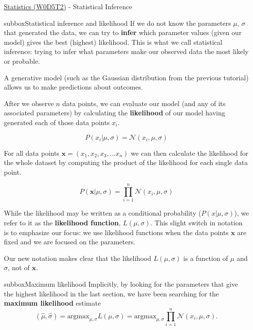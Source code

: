 \begin{textbox}{\href{https://compneuro.neuromatch.io/tutorials/W0D5_Statistics/student/W0D5_Tutorial2.html}{Statistics (W0D5T2)} - Statistical Inference}
\begin{subbox}{subbox}{Statistical inference and likelihood}
\scriptsize
If we do not know the parameters $\mu$, $\sigma$ that generated the data, we can try to \textbf{infer} which parameter values (given our model) gives the best (highest) likelihood. This is what we call statistical inference: trying to infer what parameters make our observed data the most likely or probable.

A generative model (such as the Gaussian distribution from the previous tutorial) allows us to make predictions about outcomes. 

After we observe $n$ data points, we can evaluate our model (and any of its associated parameters) by calculating the \textbf{likelihood} of our model having generated each of those data points $x_i$.

\begin{equation}
P(x_i|\mu,\sigma)=\mathcal{N}(x_i,\mu,\sigma)
\end{equation}

For all data points $\mathbf{x}=(x_1, x_2, x_3, ...x_n) $ we can then calculate the likelihood for the whole dataset by computing the product of the likelihood for each single data point.

\begin{equation}
P(\mathbf{x}|\mu,\sigma)=\prod_{i=1}^n \mathcal{N}(x_i,\mu,\sigma)
\end{equation}

While the likelihood may be written as a conditional probability ($P(x|\mu,\sigma)$), we refer to it as the \textbf{likelihood function}, $L(\mu,\sigma)$.  This slight switch in notation is to emphasize our focus: we use likelihood functions when the data points $\mathbf{x}$ are fixed and we are focused on the parameters.

Our new notation makes clear that the likelihood $L(\mu,\sigma)$ is a function of $\mu$ and $\sigma$, not of $\mathbf{x}$.


\end{subbox}
\begin{subbox}{subbox}{Maximum likelihood}
\scriptsize
Implicitly, by looking for the parameters that give the highest likelihood in the last section, we have been searching for the \textbf{maximum likelihood} estimate
\begin{equation}
(\hat{\mu},\hat{\sigma}) = \text{argmax}_{\mu,\sigma}L(\mu,\sigma) = \text{argmax}_{\mu,\sigma} \prod_{i=1}^n \mathcal{N}(x_i,\mu,\sigma).
\end{equation}


\end{subbox}
\end{textbox}
